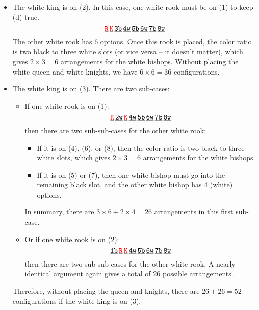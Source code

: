 \documentclass[11pt]{article}
\begin{document}
\begin{itemize}
	\item The white king is on (2). In this case, one white rook must be on (1) to keep (d) true.
	\begin{equation*}
	\underline{\texttt{\textcolor{red}{R}}}\,
	\underline{\texttt{\textcolor{red}{K}}}\,
	\underline{\texttt{3b}}\,
	\underline{\texttt{4w}}\,
	\underline{\texttt{5b}}\,
	\underline{\texttt{6w}}\,
	\underline{\texttt{7b}}\,
	\underline{\texttt{8w}}
	\end{equation*}
	The other white rook has 6 options. Once this rook is placed, the color ratio is two black to three white slots (or vice versa -- it doesn't matter), which gives $2\times 3 = 6$ arrangements for the white bishops. Without placing the white queen and white knights, we have $6\times 6 =  \boxed{36}$ configurations. 
	
	
	\item The white king is on (3). There are two sub-cases:
	\begin{itemize}
		\item If one white rook is on (1):
		\begin{equation*}
		\underline{\texttt{\textcolor{red}{R}}}\,
		\underline{\texttt{2w}}\,
		\underline{\texttt{\textcolor{red}{K}}}\,
		\underline{\texttt{4w}}\,
		\underline{\texttt{5b}}\,
		\underline{\texttt{6w}}\,
		\underline{\texttt{7b}}\,
		\underline{\texttt{8w}}
		\end{equation*}
		then there are two sub-sub-cases for the other white rook:
		\begin{itemize}
			\item If it is on (4), (6), or (8), then the color ratio is two black to three white slots, which gives $2\times 3 = 6$ arrangements for the white bishops.
			
			\item If it is on (5) or (7), then one white bishop must go into the remaining black slot, and the other white bishop has 4 (white) options. 
		\end{itemize}
		In summary, there are $3\times6+2\times4= 26$ arrangements in this first sub-case.
		
		\item Or if one white rook is on (2):
		\begin{equation*}
		\underline{\texttt{1b}}\,
		\underline{\texttt{\textcolor{red}{R}}}\,
		\underline{\texttt{\textcolor{red}{K}}}\,
		\underline{\texttt{4w}}\,
		\underline{\texttt{5b}}\,
		\underline{\texttt{6w}}\,
		\underline{\texttt{7b}}\,
		\underline{\texttt{8w}}
		\end{equation*}
		then there are two sub-sub-cases for the other white rook. A nearly identical argument again gives a total of 26 possible arrangements. 
	\end{itemize}
	Therefore, without placing the queen and knights, there are $26+26 = \boxed{52}$ configurations if the white king is on (3).
	

\end{itemize}
\end{document}
